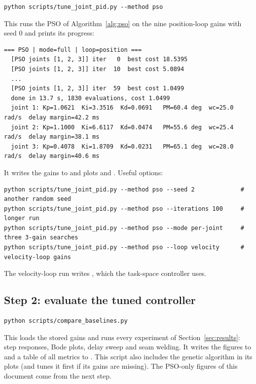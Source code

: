 \documentclass[11pt,a4paper]{article}
\begin{document}
\begin{lstlisting}
python scripts/tune_joint_pid.py --method pso
\end{lstlisting}
This runs the PSO of Algorithm~\ref{alg:pso} on the nine position-loop gains with seed 0 and prints its
progress:
\begin{lstlisting}[basicstyle=\ttfamily\footnotesize]
=== PSO | mode=full | loop=position ===
  [PSO joints [1, 2, 3]] iter   0  best cost 18.5395
  [PSO joints [1, 2, 3]] iter  10  best cost 5.0894
  ...
  [PSO joints [1, 2, 3]] iter  59  best cost 1.0499
  done in 13.7 s, 1830 evaluations, cost 1.0499
  joint 1: Kp=1.0621  Ki=3.3516  Kd=0.0691   PM=60.4 deg  wc=25.0 rad/s  delay margin=42.2 ms
  joint 2: Kp=1.1000  Ki=6.6117  Kd=0.0474   PM=55.6 deg  wc=25.4 rad/s  delay margin=38.1 ms
  joint 3: Kp=0.4078  Ki=1.8709  Kd=0.0231   PM=65.1 deg  wc=28.0 rad/s  delay margin=40.6 ms
\end{lstlisting}
It writes the gains to  and plots
 and . Useful options:
\begin{lstlisting}[basicstyle=\ttfamily\footnotesize]
python scripts/tune_joint_pid.py --method pso --seed 2             # another random seed
python scripts/tune_joint_pid.py --method pso --iterations 100     # longer run
python scripts/tune_joint_pid.py --method pso --mode per-joint     # three 3-gain searches
python scripts/tune_joint_pid.py --method pso --loop velocity      # velocity-loop gains
\end{lstlisting}
The velocity-loop run writes , which the task-space controller uses.

\subsection{Step 2: evaluate the tuned controller}

\begin{lstlisting}
python scripts/compare_baselines.py
\end{lstlisting}
This loads the stored gains and runs every experiment of Section~\ref{sec:results}: step responses, Bode
plots, delay sweep and seam welding. It writes the figures to  and a table of all metrics to
. This script also includes the genetic algorithm in its plots (and tunes it first
if its gains are missing). The PSO-only figures of this document come from the next step.
\end{document}

